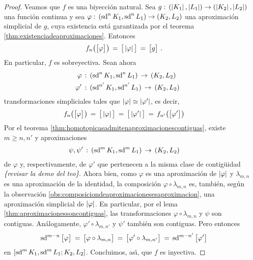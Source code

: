 \begin{proof}
	Veamos que $f$ es una biyecci\'{o}n natural. Sea
	\begin{math}
		g:\,(\geom{K_{1}},\geom{L_{1}})\rightarrow
			(\geom{K_{2}},\geom{L_{2}})
	\end{math}
	una funci\'{o}n continua y sea
	\begin{math}
		\varphi:\,(\subdiv[n]{K_{1}},\subdiv[n]{L_{1}})\rightarrow
			(K_{2},L_{2})
	\end{math}
	una aproximaci\'{o}n simplicial de $g$, cuya existencia est\'{a}
	garantizada por el teorema \ref{thm:existenciadeaproximaciones}.
	Entonces
	\begin{align*}
		f_{n}\big(\clase{\varphi}\big) & \,=\,\clase{\geom{\varphi}}	
			\,=\,\clase{g}
		\text{ .}
	\end{align*}
	En particular, $f$ es sobreyectiva. Sean ahora
	\begin{align*}
		\varphi & \,:\,(\subdiv[n]{K_{1}},\subdiv[n]{L_{1}})
			\,\rightarrow\,(K_{2},L_{2}) \\
		\varphi' & \,:\,(\subdiv[n']{K_{1}},\subdiv[n']{L_{1}})
			\,\rightarrow\,(K_{2},L_{2})
	\end{align*}
	transformaciones simpliciales tales que
	$\geom{\varphi}\simeq\geom{\varphi'}$, es decir,
	\begin{align*}
		f_{n}\big(\clase{\varphi}\big) & \,=\,
			\clase{\geom{\varphi}} \,=\,
			\clase{\geom{\varphi'}} \,=\,
			f_{n'}\big(\clase{\varphi'}\big)
	\end{align*}
	Por el teorema \ref{thm:homotopicasadmitenaproximacionescontiguas},
	existe $m\geq n,n'$ y aproximaciones
	\begin{align*}
		\psi,\psi' & \,:\,(\subdiv[m]{K_{1}},\subdiv[m]{L_{1}})
			\,\rightarrow\,(K_{2},L_{2})
	\end{align*}
	de $\varphi$ y, respectivamente, de $\varphi'$ que pertenecen a la
	misma clase de contig\"{u}idad \textit{\{revisar la demo del teo\}}.
	Ahora bien, como $\varphi$ es una aproximaci\'{o}n de $\geom{\varphi}$
	y $\lambda_{m,n}$ es una aproximaci\'{o}n de la identidad, la
	composici\'{o}n $\varphi\circ\lambda_{m,n}$ es, tambi\'{e}n, seg\'{u}n
	la observaci\'{o}n \ref{obs:composiciondeaproximacionesesaproximacion},
	una aproximaci\'{o}n simplicial de $\geom{\varphi}$. En particular,
	por el lema \ref{thm:aproximacionessoncontiguas}, las transformaciones
	$\varphi\circ\lambda_{m,n}$ y $\psi$ son contiguas. An\'{a}logamente,
	$\varphi'\circ\lambda_{m,n'}$ y $\psi'$ tambi\'{e}n son contiguas.
	Pero entonces
	\begin{align*}
		\subdiv[m-n]{\clase{\varphi}} & \,=\,
			\clase{\varphi\circ\lambda_{m,n}} \,=\,
			\clase{\varphi'\circ\lambda_{m,n'}} \,=\,
			\subdiv[m-n']{\clase{\varphi'}}
	\end{align*}
	en $\contiguas{\subdiv[m]{K_{1}},\subdiv[m]{L_{1}}}{K_{2},L_{2}}$.
	Concluimos, as\'{\i}, que $f$ es inyectiva.
\end{proof}

